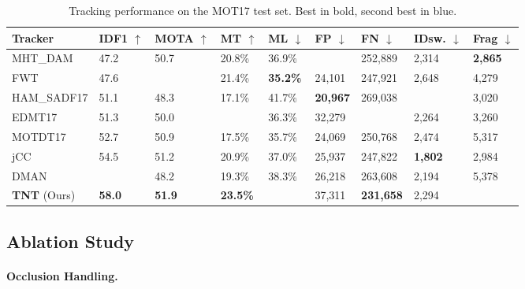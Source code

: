 \documentclass[10pt,twocolumn,letterpaper]{article}
\begin{document}
\begin{table*}
\begin{center}
\begin{tabular}{|L{2.9cm}|C{1.2cm}|C{1.3cm}|C{1.2cm}|C{1.2cm}|C{1.2cm}|C{1.2cm}|C{1.2cm}|C{1.2cm}|}
\hline
Tracker & IDF1 $\uparrow$ & MOTA $\uparrow$ & MT $\uparrow$ & ML $\downarrow$ & FP $\downarrow$ & FN $\downarrow$ & IDsw. $\downarrow$ & Frag $\downarrow$ \\
\hline\hline
MHT\_DAM \cite{kim2015multiple} & 47.2 & 50.7 & 20.8\% & 36.9\% & \noindent\color{cyan}{22,875} & 252,889 & 2,314 & \textbf{2,865} \\
FWT \cite{henschel2018fusion} & 47.6 & \noindent\color{cyan}{51.3} & 21.4\% & \textbf{35.2\%} & 24,101 & 247,921 & 2,648 & 4,279 \\
HAM\_SADF17 \cite{yoon2018online} & 51.1 & 48.3 & 17.1\% & 41.7\% & \textbf{20,967} & 269,038 & \noindent\color{cyan}{1,871} & 3,020 \\
EDMT17 \cite{chen2017enhancing} & 51.3 & 50.0 & \noindent\color{cyan}{21.6\%} & 36.3\% & 32,279 & \noindent\color{cyan}{247,297} & 2,264 & 3,260 \\
MOTDT17 \cite{long2018real} & 52.7 & 50.9 & 17.5\% & 35.7\% & 24,069 & 250,768 & 2,474 & 5,317 \\
jCC \cite{keuper2018motion} & 54.5 & 51.2 & 20.9\% & 37.0\% & 25,937 & 247,822 & \textbf{1,802} & 2,984 \\
DMAN \cite{zhu2018online} & \noindent\color{cyan}{55.7} & 48.2 & 19.3\% & 38.3\% & 26,218 & 263,608 & 2,194 & 5,378 \\
\hline
\textbf{TNT} (Ours) & \textbf{58.0} & \textbf{51.9} & \textbf{23.5\%} & \noindent\color{cyan}{35.5\%} & 37,311 & \textbf{231,658} & 2,294 & \noindent\color{cyan}{2,917} \\
\hline
\end{tabular}
\end{center}
\caption{Tracking performance on the MOT17 test set. Best in bold, second best in blue. 
}
\label{tab:mot17}
\end{table*}

\subsection{Ablation Study} 



\paragraph{Occlusion Handling.}
\end{document}
